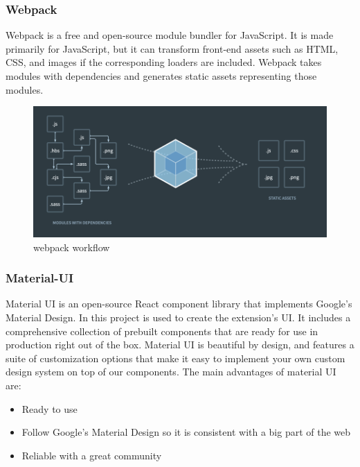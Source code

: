 \subsubsection {Webpack}

Webpack is a free and open-source module bundler for JavaScript. It is made primarily for JavaScript, but it can transform front-end assets such as HTML, CSS, and images if the corresponding loaders are included. Webpack takes modules with dependencies and generates static assets representing those modules.

\begin{figure}[h!]
    \vspace{0.5cm}
    \includegraphics[width=\textwidth]{images/extension/webpack-bundle.png}
    \caption{webpack workflow}
    \label{fig:webpack-bundle} %
\end{figure}

\subsubsection {Material-UI}

Material UI is an open-source React component library that implements Google's Material Design. In this project is used to create the extension's UI.
It includes a comprehensive collection of prebuilt components that are ready for use in production right out of the box.
Material UI is beautiful by design, and features a suite of customization options that make it easy to implement your own custom design system on top of our components.
The main advantages of material UI are:

\begin{itemize}
    \item Ready to use
    \item Follow Google's Material Design so it is consistent with a big part of the web
    \item Reliable with a great community
\end{itemize}



